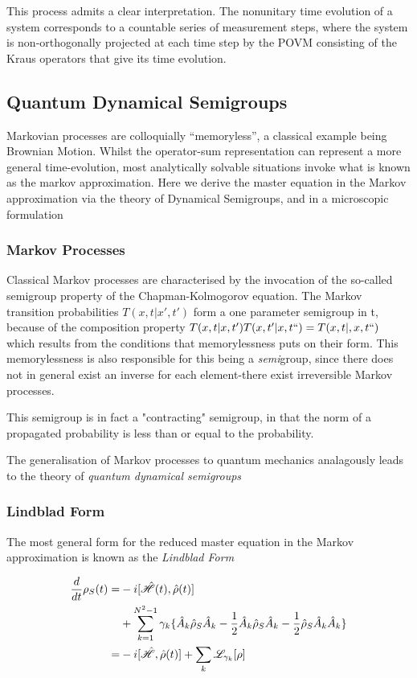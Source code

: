 This process admits a clear interpretation.
The nonunitary time evolution of a system corresponds to a countable series of measurement steps, where the system is non-orthogonally projected at each time step by the POVM consisting of the Kraus operators that give its time evolution.

\subsection{Quantum Dynamical Semigroups}
Markovian processes are colloquially ``memoryless'', a classical example being Brownian Motion.
Whilst the operator-sum representation can represent a more general time-evolution, most analytically solvable situations invoke what is known as the markov approximation.
Here we derive the master equation in the Markov approximation via the theory of Dynamical Semigroups, and in a microscopic formulation

\subsubsection{Markov Processes}
Classical Markov processes are characterised by the invocation of the so-called semigroup property of the Chapman-Kolmogorov equation.
The Markov transition probabilities $T(x, t|x', t')$ form a one parameter semigroup in t, because of the composition property $T(x, t|x, t')T(x, t'|x, t``) = T(x, t|,x, t``)$ which results from the conditions that memorylessness puts on their form.
This memorylessness is also responsible for this being a \emph{semi}group, since there does not in general exist an inverse for each element-there exist irreversible Markov processes.

This semigroup is in fact a "contracting" semigroup, in that the norm of a propagated probability is less than or equal to the probability.

The generalisation of Markov processes to quantum mechanics analagously leads to the theory of \emph{quantum dynamical semigroups}

\subsubsection{Lindblad Form}
The most general form\cite[119--122]{Breuer2002} for the reduced master equation in the Markov approximation is known as the \emph{Lindblad Form}

\begin{align}
        \frac{d}{dt} \rho_S (t) =& -i[\hat{\mathscr{H}} (t), \hat{\rho} (t)\notag]\\
                                 & + \sum_{k=1}^{N^2-1} \gamma_k \{ \hat{A}_k \hat{\rho}_S \hat{A}_k -\frac{1}{2}  \hat{A}_k \hat{\rho}_S \hat{A}_k -\frac{1}{2} \hat{\rho}_S \hat{A}_k \hat{A}_k \}\\
        = & -i[\hat{\mathscr{H}}, \hat{\rho}(t)]+ \sum_k \mathscr{L}_{\gamma_{k}} [\rho]
\end{align}


